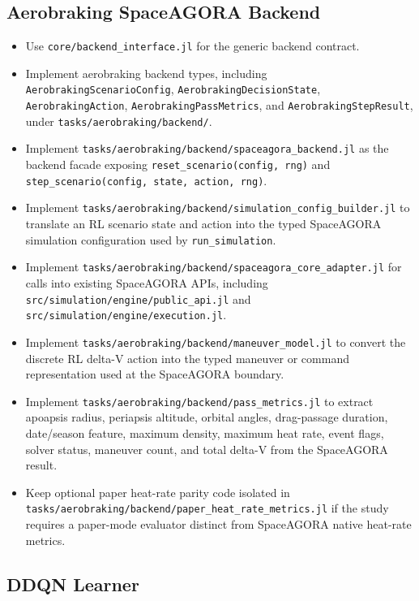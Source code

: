 \documentclass[11pt]{article}
\begin{document}
\subsection{Aerobraking SpaceAGORA Backend}

\begin{itemize}
\item Use \texttt{core/backend\_interface.jl} for the generic backend contract.
\item Implement aerobraking backend types, including \texttt{AerobrakingScenarioConfig}, \texttt{AerobrakingDecisionState}, \texttt{AerobrakingAction}, \texttt{AerobrakingPassMetrics}, and \texttt{AerobrakingStepResult}, under \texttt{tasks/aerobraking/backend/}.
\item Implement \texttt{tasks/aerobraking/backend/spaceagora\_backend.jl} as the backend facade exposing \texttt{reset\_scenario(config, rng)} and \texttt{step\_scenario(config, state, action, rng)}.
\item Implement \texttt{tasks/aerobraking/backend/simulation\_config\_builder.jl} to translate an RL scenario state and action into the typed SpaceAGORA simulation configuration used by \texttt{run\_simulation}.
\item Implement \texttt{tasks/aerobraking/backend/spaceagora\_core\_adapter.jl} for calls into existing SpaceAGORA APIs, including \texttt{src/simulation/engine/public\_api.jl} and \texttt{src/simulation/engine/execution.jl}.
\item Implement \texttt{tasks/aerobraking/backend/maneuver\_model.jl} to convert the discrete RL delta-V action into the typed maneuver or command representation used at the SpaceAGORA boundary.
\item Implement \texttt{tasks/aerobraking/backend/pass\_metrics.jl} to extract apoapsis radius, periapsis altitude, orbital angles, drag-passage duration, date/season feature, maximum density, maximum heat rate, event flags, solver status, maneuver count, and total delta-V from the SpaceAGORA result.
\item Keep optional paper heat-rate parity code isolated in \texttt{tasks/aerobraking/backend/paper\_heat\_rate\_metrics.jl} if the study requires a paper-mode evaluator distinct from SpaceAGORA native heat-rate metrics.
\end{itemize}

\subsection{DDQN Learner}
\end{document}
